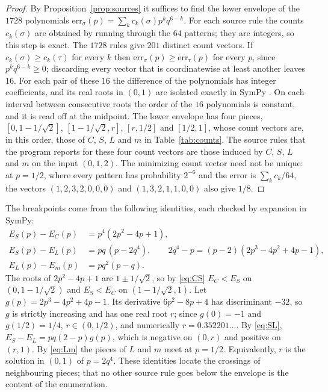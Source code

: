 \documentclass[11pt]{article}
\theoremstyle{remark}
\begin{document}
\begin{proof}
By Proposition~\ref{prop:sources} it suffices to find the lower envelope of the $1728$ polynomials $\mathrm{err}_\sigma(p)=\sum_kc_k(\sigma)p^kq^{6-k}$. For each source rule the counts $c_k(\sigma)$ are obtained by running through the $64$ patterns; they are integers, so this step is exact. The $1728$ rules give $201$ distinct count vectors. If $c_k(\sigma)\ge c_k(\tau)$ for every $k$ then $\mathrm{err}_\sigma(p)\ge\mathrm{err}_\tau(p)$ for every $p$, since $p^kq^{6-k}\ge0$; discarding every vector that is coordinatewise at least another leaves $16$. For each pair of these $16$ the difference of the polynomials has integer coefficients, and its real roots in $(0,1)$ are isolated exactly in SymPy \cite{SymPy}. On each interval between consecutive roots the order of the $16$ polynomials is constant, and it is read off at the midpoint. The lower envelope has four pieces, $[0,1-1/\sqrt2]$, $[1-1/\sqrt2,r]$, $[r,1/2]$ and $[1/2,1]$, whose count vectors are, in this order, those of $C$, $S$, $L$ and $m$ in Table~\ref{tab:counts}. The source rules that the program reports for these four count vectors are those induced by $C$, $S$, $L$ and $m$ on the input $(0,1,2)$. The minimizing count vector need not be unique: at $p=1/2$, where every pattern has probability $2^{-6}$ and the error is $\sum_kc_k/64$, the vectors $(1,2,3,2,0,0,0)$ and $(1,3,2,1,1,0,0)$ also give $1/8$.
\end{proof}

The breakpoints come from the following identities, each checked by expansion in SymPy:
\begin{align}
E_S(p)-E_C(p)&=p^4(2p^2-4p+1),\label{eq:CS}\\
E_S(p)-E_L(p)&=pq\,(p-2q^4),\qquad 2q^4-p=(p-2)(2p^3-4p^2+4p-1),\label{eq:SL}\\
E_L(p)-E_m(p)&=pq^2(p-q).\label{eq:Lm}
\end{align}
The roots of $2p^2-4p+1$ are $1\pm1/\sqrt2$, so by \eqref{eq:CS} $E_C<E_S$ on $(0,1-1/\sqrt2)$ and $E_S<E_C$ on $(1-1/\sqrt2,1)$. Let $g(p)=2p^3-4p^2+4p-1$. Its derivative $6p^2-8p+4$ has discriminant $-32$, so $g$ is strictly increasing and has one real root $r$; since $g(0)=-1$ and $g(1/2)=1/4$, $r\in(0,1/2)$, and numerically $r=0.352201\dots$. By \eqref{eq:SL}, $E_S-E_L=pq(2-p)g(p)$, which is negative on $(0,r)$ and positive on $(r,1)$. By \eqref{eq:Lm} the pieces of $L$ and $m$ meet at $p=1/2$. Equivalently, $r$ is the solution in $(0,1)$ of $p=2q^4$. These identities locate the crossings of neighbouring pieces; that no other source rule goes below the envelope is the content of the enumeration.
\end{document}
